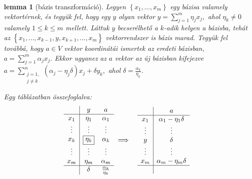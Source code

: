 \documentclass[9pt, a4paper, showtrims]{memoir}
\theoremstyle{plain}
\newtheorem{lemma}[proposition]{lemma}
\theoremstyle{remark}
\theoremstyle{definition}
\begin{document}
\begin{lemma}[bázis transzformáció]\label{le:bazistrafo}
    Legyen $\left\{ x_1,\dots,x_m \right\}$ egy bázisa valamely vektortérnek,
    és tegyük fel, 
    hogy egy $y$ olyan vektor
    \(
        y=\sum_{j=1}^m\eta_jx_j,
    \)
    ahol $\eta_k\neq 0$ valamely $1\leq k\leq m$ mellett. 
    Láttuk $y$ becserélhető a $k$-adik helyen a bázisba, 
    tehát az
    \(
        \left\{ x_1,\dots,x_{k-1},y,x_{k+1},\dots,x_m \right\}
    \)
    vektorrendszer is bázis marad.
    Tegyük fel továbbá, hogy $a\in V$ vektor koordinátái ismertek az eredeti bázisban,
    \(
        a=
        \sum_{j=1}^m\alpha_j x_j.
    \)
    Ekkor ugyanez az $a$ vektor az új bázisban kifejezve
    \(
        a=
        \sum_{\substack{j=1,\\j\neq k}}^n\left( \alpha_j-\eta_j\delta \right)x_j
        +\delta y_k,
    \)
    ahol $\delta=\frac{\alpha_k}{\eta_k}$.

    Egy táblázatban összefoglalva:
\begin{eqnarray}\label{alg:bazistrafo}
    \begin{array}{c|cc}
        &y      &a         \\
        \hline
        x_1         &\eta_1  &\alpha_1   \\
        \vdots      &\vdots &\vdots    \\
        x_k         &\boxed{\eta_k}  &\alpha_k   \\
        \vdots      &\vdots &\vdots    \\
        x_m         &\eta_m  &\alpha_m   \\
        \hline
        &\delta &\frac{\alpha_k}{\eta_k}
    \end{array}
    &\implies&
    \begin{array}{c|c}
                    &a                       \\
        \hline
        x_1         &\alpha_1-\eta_1\delta   \\
        \vdots      &\vdots                  \\
        y           &\delta                  \\
        \vdots      &\vdots                  \\
        x_m         &\alpha_m-\eta_m\delta   \\
        \hline
        \phantom{\delta}&
    \end{array}
\end{eqnarray}
\end{lemma}
\end{document}
